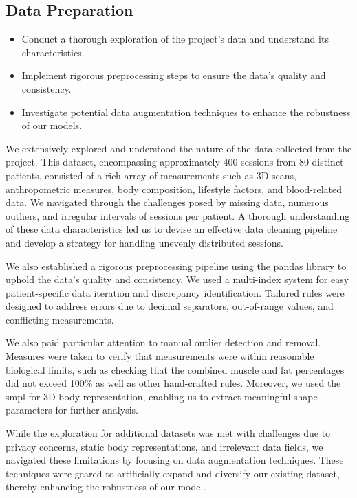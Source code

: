 \subsection{Data Preparation}

\begin{itemize}
      \item Conduct a thorough exploration of the project's data and understand its
            characteristics.
      \item Implement rigorous preprocessing steps to ensure the data's quality and
            consistency.
      \item Investigate potential data augmentation techniques to enhance the robustness of
            our models.
\end{itemize}

We extensively explored and understood the nature of the data collected from
the project. This dataset, encompassing approximately 400 sessions from 80
distinct patients, consisted of a rich array of measurements such as 3D scans,
anthropometric measures, body composition, lifestyle factors, and blood-related
data. We navigated through the challenges posed by missing data, numerous
outliers, and irregular intervals of sessions per patient. A thorough
understanding of these data characteristics led us to devise an effective data
cleaning pipeline and develop a strategy for handling unevenly distributed
sessions.

We also established a rigorous preprocessing pipeline using the \gls{pandas}
library to uphold the data's quality and consistency. We used a multi-index
system for easy patient-specific data iteration and discrepancy identification.
Tailored rules were designed to address errors due to decimal separators,
out-of-range values, and conflicting measurements.

We also paid particular attention to manual outlier detection and removal.
Measures were taken to verify that measurements were within reasonable
biological limits, such as checking that the combined muscle and fat
percentages did not exceed 100\% as well as other hand-crafted rules. Moreover,
we used the \gls{smpl} for 3D body representation, enabling us to extract
meaningful shape parameters for further analysis.

While the exploration for additional datasets was met with challenges due to
privacy concerns, static body representations, and irrelevant data fields, we
navigated these limitations by focusing on data augmentation techniques. These
techniques were geared to artificially expand and diversify our existing
dataset, thereby enhancing the robustness of our model.

